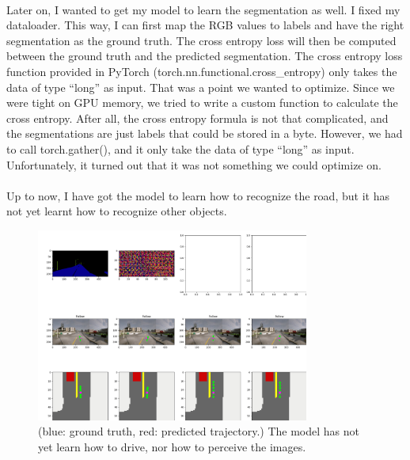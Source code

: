 \documentclass[inputenc=utf8]{ldvarticle}
\begin{document}

\noindent \\Later on, I wanted to get my model to learn the segmentation as well. I fixed my dataloader. This way, I can first map the RGB values to labels and have the right segmentation as the ground truth. The cross entropy loss will then be computed between the ground truth and the predicted segmentation. The cross entropy loss function provided in PyTorch (torch.nn.functional.cross\_entropy) only takes the data of type “long” as input. That was a point we wanted to optimize. Since we were tight on GPU memory, we tried to write a custom function to calculate the cross entropy. After all, the cross entropy formula is not that complicated, and the segmentations are just labels that could be stored in a byte. However, we had to call torch.gather(), and it only take the data of type “long” as input. Unfortunately, it turned out that it was not something we could optimize on.
\\
\noindent \\Up to now, I have got the model to learn how to recognize the road, but it has not yet learnt how to recognize other objects.
\begin{figure}[H]
  \centering
  \includegraphics[width=0.8\textwidth] {bilder/northern_pyramid_0.png} 
  \caption{(blue: ground truth, red: predicted trajectory.) The model has not yet learn how to drive, nor how to perceive the images.}
\end{figure}
\end{document}
